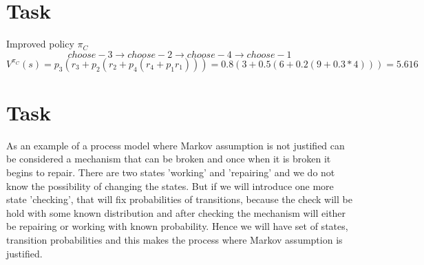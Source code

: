 \documentclass[english]{scrartcl}
\begin{document}
\section{Task}
Improved policy $\pi_{C}$
$$choose-3 \rightarrow choose-2 \rightarrow choose-4 \rightarrow choose-1$$
$$V^{\pi_{C}}(s)=p_{3}(r_{3} + p_{2}(r_{2} + p_{4}(r_{4} + p_{1}r_{1})))=0.8(3 + 0.5(6 + 0.2(9 + 0.3*4)))=5.616$$

\section{Task}
As an example of a process model where Markov assumption is not justified can be considered a mechanism that can be broken and once when it is broken it begins to repair. There are two states 'working' and 'repairing' and we do not know the possibility of changing the states. But if we will introduce one more state 'checking', that will fix probabilities of transitions, because the check will be hold with some known distribution and after checking the mechanism will either be repairing or working with known probability. Hence we will have set of states, transition probabilities and this makes the process where Markov assumption is justified.
\end{document}
